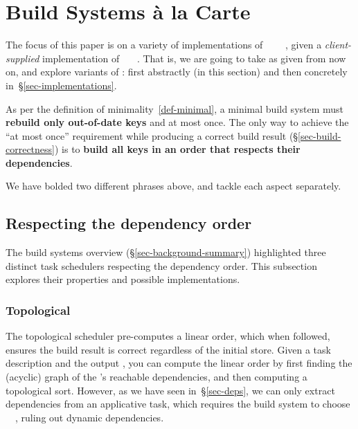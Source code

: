 \section{Build Systems \`a la Carte}\label{sec-build}

The focus of this paper is on a variety of implementations of
~~~~, given
a \emph{client-supplied} implementation of ~~~. That
is, we are going to take  as given from now on, and explore variants of
: first abstractly (in this section) and then concretely
in~\S\ref{sec-implementations}.

As per the definition of minimality~\ref{def-minimal}, a minimal build
system must \textbf{rebuild only out-of-date keys} and at most once. The only
way to achieve the ``at most once'' requirement while producing a correct build
result (\S\ref{sec-build-correctness}) is to \textbf{build all keys in an
order that respects their dependencies}.

\vspace{1mm}
We have bolded two different phrases above, and tackle each aspect separately.

\subsection{Respecting the dependency order}
\label{sec-dependency-orderings}

The build systems overview (\S\ref{sec-background-summary}) highlighted three
distinct task schedulers respecting the dependency order. This subsection
explores their properties and possible implementations.

\vspace{-2mm}
\subsubsection{Topological}\label{sec-topological}

The topological scheduler pre-computes a linear order, which when followed,
ensures the build result is correct regardless of the initial store. Given a
task description and the output , you can compute the linear order by
first finding the (acyclic) graph of the 's reachable dependencies, and
then computing a topological sort. However, as we have seen in~\S\ref{sec-deps},
we can only extract dependencies from an applicative task, which requires the
build system to choose ~\hs{=}~, ruling out dynamic
dependencies.

